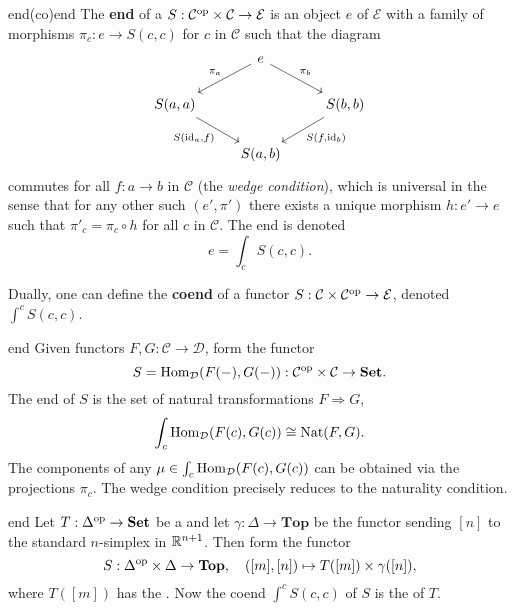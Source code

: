 \begin{topic}{end}{(co)end}
    The \textbf{end} of a  $S : \mathcal{C}^\textup{op} \times \mathcal{C} \to \mathcal{E}$ is an object $e$ of $\mathcal{E}$ with a family of morphisms $\pi_c : e \to S(c, c)$ for $c$ in $\mathcal{C}$ such that the diagram
    \[ \begin{tikzcd} & e \arrow[swap]{ld}{\pi_a} \arrow{dr}{\pi_b} & \\ S(a, a) \arrow[swap]{dr}{S(\id_a, f)} && S(b, b) \arrow{ld}{S(f, \id_b)} \\ & S(a, b) & \end{tikzcd} \]
    commutes for all $f : a \to b$ in $\mathcal{C}$ (the \textit{wedge condition}), which is universal in the sense that for any other such $(e', \pi')$ there exists a unique morphism $h : e' \to e$ such that $\pi'_c = \pi_c \circ h$ for all $c$ in $\mathcal{C}$. The end is denoted
    \[ e = \int_c S(c, c) . \]
    
    Dually, one can define the \textbf{coend} of a functor $S : \mathcal{C} \times \mathcal{C}^\textup{op} \to \mathcal{E}$, denoted $\int^c S(c, c)$.
\end{topic}

\begin{example}{end}
    Given functors $F, G : \mathcal{C} \to \mathcal{D}$, form the functor
    \[ S = \operatorname{Hom}_\mathcal{D}(F(-), G(-)) : \mathcal{C}^\textup{op} \times \mathcal{C} \to \textbf{Set} . \]
    The end of $S$ is the set of natural transformations $F \Rightarrow G$,
    \[ \int_c \operatorname{Hom}_\mathcal{D}(F(c), G(c)) \cong \textup{Nat}(F, G) . \]
    The components of any $\mu \in \int_c \operatorname{Hom}_\mathcal{D}(F(c), G(c))$ can be obtained via the projections $\pi_c$. The wedge condition precisely reduces to the naturality condition.
\end{example}

\begin{example}{end}
    Let $T : \Delta^\textup{op} \to \textbf{Set}$ be a  and let $\gamma : \Delta \to \textbf{Top}$ be the functor sending $[n]$ to the standard $n$-simplex in $\mathbb{R}^{n + 1}$. Then form the functor
    \[ S : \Delta^\textup{op} \times \Delta \to \textbf{Top}, \quad ([m], [n]) \mapsto T([m]) \times \gamma([n]) , \]
    where $T([m])$ has the . Now the coend $\int^c S(c, c)$ of $S$ is the  of $T$.
\end{example}

